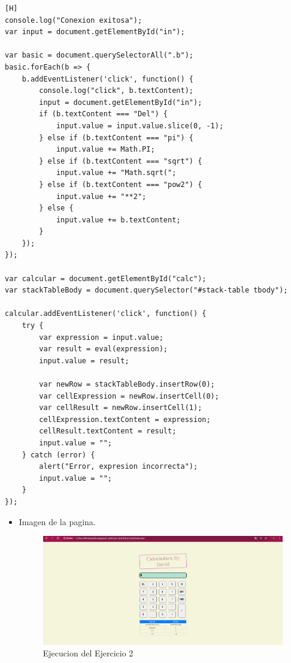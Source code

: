 \documentclass{article}
\begin{document}
	\begin{lstlisting}[language=html,caption={Ejercicio2/scriptejercicio02.js}][H]
console.log("Conexion exitosa");
var input = document.getElementById("in");

var basic = document.querySelectorAll(".b");
basic.forEach(b => {
    b.addEventListener('click', function() {
        console.log("click", b.textContent);
        input = document.getElementById("in");
        if (b.textContent === "Del") {
            input.value = input.value.slice(0, -1);
        } else if (b.textContent === "pi") {
            input.value += Math.PI;
        } else if (b.textContent === "sqrt") {
            input.value += "Math.sqrt(";
        } else if (b.textContent === "pow2") {
            input.value += "**2";
        } else {
            input.value += b.textContent;
        }
    });
});

var calcular = document.getElementById("calc");
var stackTableBody = document.querySelector("#stack-table tbody");

calcular.addEventListener('click', function() {
    try {
        var expression = input.value;
        var result = eval(expression);
        input.value = result;
        
        var newRow = stackTableBody.insertRow(0); 
        var cellExpression = newRow.insertCell(0);
        var cellResult = newRow.insertCell(1);
        cellExpression.textContent = expression;
        cellResult.textContent = result;
        input.value = "";
    } catch (error) {
        alert("Error, expresion incorrecta");
        input.value = "";
    }
});
	\end{lstlisting}
	\begin{itemize}	
		\item Imagen de la pagina.
		\begin{figure}[H]
            \centering
            \includegraphics[width=\textwidth]{img/pag2}
            \caption{Ejecucion del Ejercicio 2}
            \label{fig:pagina}
        \end{figure}
	\end{itemize}
	
\end{document}
